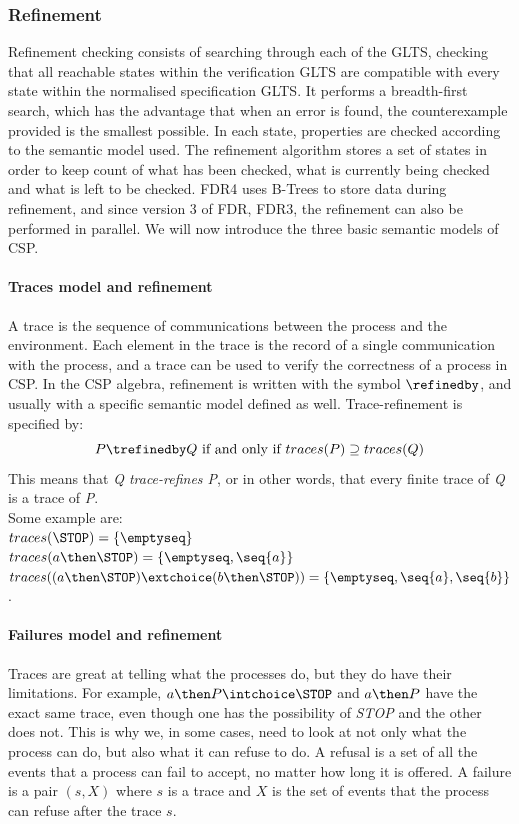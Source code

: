 \subsubsection{Refinement}
\label{sec:refinement}
Refinement checking consists of searching through each of the GLTS, checking that all reachable states within the verification GLTS are compatible with every state within the normalised specification GLTS. It performs a breadth-first search, which has the advantage that when an error is found, the counterexample provided is the smallest possible. In each state, properties are checked according to the semantic model used. The refinement algorithm stores a set of states in order to keep count of what has been checked, what is currently being checked and what is left to be checked. FDR4 uses B-Trees to store data during refinement, and since version 3 of FDR, FDR3, the refinement can also be performed in parallel.
We will now introduce the three basic semantic models of CSP.
\paragraph{Traces model and refinement}
A trace is the sequence of communications between the process and the environment. Each element in the trace is the record of a single communication with the process, and a trace can be used to verify the correctness of a process in CSP. In the CSP algebra, refinement is written with the symbol $\refinedby$, and usually with a specific semantic model defined as well. Trace-refinement is specified by: \\
$$P \trefinedby Q \text{ if and only if } traces(P) \supseteq traces(Q)$$
This means that \textit{Q trace-refines P}, or in other words, that every finite trace of \textit{Q} is a trace of \textit{P}. \\
Some example are:\\
$traces(\STOP) = \{\emptyseq\}$\\
$traces(a \then \STOP) = \{\emptyseq, \seq{a}\}$\\
$traces((a \then \STOP)\extchoice (b \then \STOP)) = \{\emptyseq, \seq{a}, \seq{b}\}$.
\paragraph{Failures model and refinement}
Traces are great at telling what the processes do, but they do have their limitations. For example, $a \then P \intchoice \STOP$ and $a \then P$ have the exact same trace, even though one has the possibility of \textit{STOP} and the other does not. This is why we, in some cases, need to look at not only what the process can do, but also what it can refuse to do. A refusal is a set of all the events that a process can fail to accept, no matter how long it is offered. A failure is a pair $(s, X)$ where $s$ is a trace and $X$ is the set of events that the process can refuse after the trace $s$.

